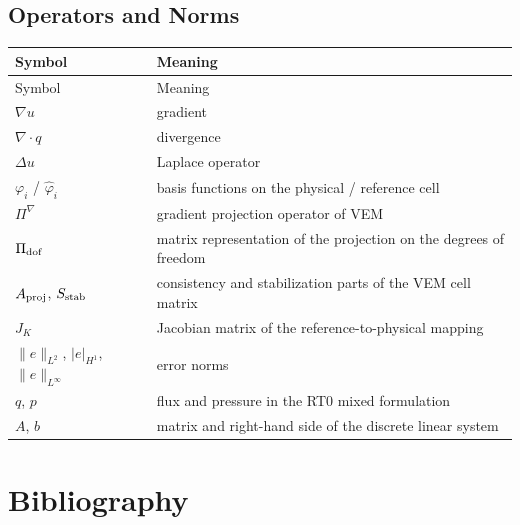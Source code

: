 \documentclass[11pt,oneside]{book}
\theoremstyle{definition}
\theoremstyle{plain}
\begin{document}
\section{Operators and Norms}

\begin{longtable}{@{}ll@{}}
\toprule
Symbol & Meaning \\
\midrule
\endfirsthead
\toprule
Symbol & Meaning \\
\midrule
\endhead
$\nabla u$ & gradient \\
$\nabla\cdot q$ & divergence \\
$\Delta u$ & Laplace operator \\
$\varphi_i$ / $\hat\varphi_i$ & basis functions on the physical / reference cell \\
$\Pi^{\nabla}$ & gradient projection operator of VEM \\
$\Pi_{\rm dof}$ & matrix representation of the projection on the degrees of freedom \\
$A_{\rm proj}$, $S_{\rm stab}$ & consistency and stabilization parts of the VEM cell matrix \\
$J_K$ & Jacobian matrix of the reference-to-physical mapping \\
$\|e\|_{L^2}$, $|e|_{H^1}$, $\|e\|_{L^\infty}$ & error norms \\
$q$, $p$ & flux and pressure in the RT0 mixed formulation \\
$A$, $b$ & matrix and right-hand side of the discrete linear system \\
\bottomrule
\end{longtable}

\chapter{Bibliography}
\label{app:bib}
\end{document}
